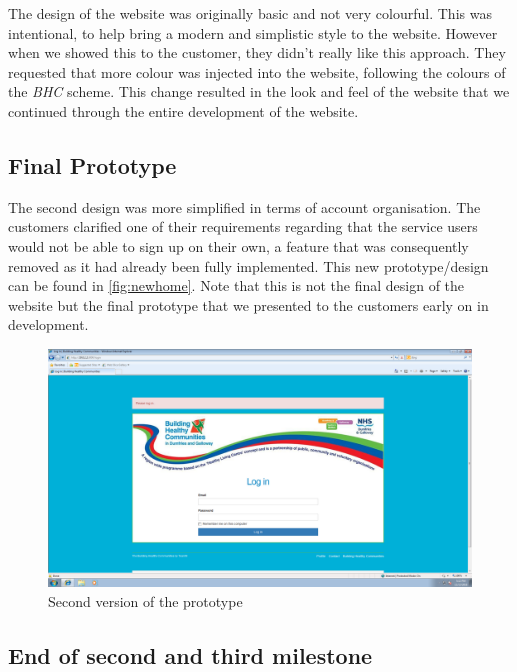 \documentclass{l3proj}
\begin{document}
The design of the website was originally basic and not very colourful. This was intentional, to help bring a modern and simplistic style to the website. However when we showed this to the customer, they didn't really like this approach. They requested that more colour was injected into the website, following the colours of the \textit{BHC} scheme. This change resulted in the look and feel of the website that we continued through the entire development of the website.

\subsection{Final Prototype}
\label{sec:prototype2}

The second design was more simplified in terms of account organisation. The customers clarified one of their requirements regarding that the service users would not be able to sign up on their own, a feature that was consequently removed as it had already been fully implemented. This new prototype/design can be found in \autoref{fig:newhome}. Note that this is not the final design of the website but the final prototype that we presented to the customers early on in development.


\begin{figure}[ht]
\centerline{\includegraphics[width=\textwidth, height=\textheight, keepaspectratio]{newhome.png}}
\caption{Second version of the prototype}
\label{fig:newhome}
\end{figure}

\subsection{End of second and third milestone}
\label{sec:milestone23}
\end{document}
